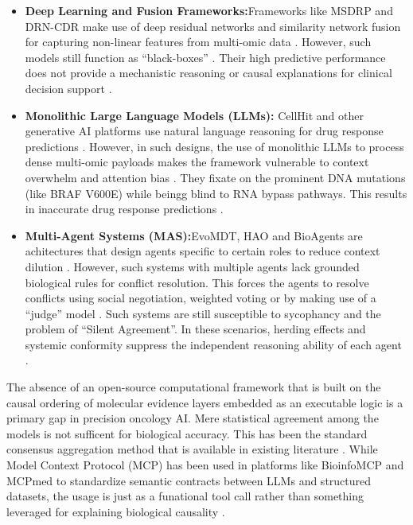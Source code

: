 \documentclass{article}
\begin{document}
\begin{itemize}
    \item \textbf{Deep Learning and Fusion Frameworks:}Frameworks like MSDRP and DRN-CDR make use of deep residual networks and similarity network fusion for capturing non-linear features from multi-omic data \cite{saranya2024drn, zhao2023msdrp}. However, such models still function as ``black-boxes'' \cite{almutiri2023predicting}. Their high predictive performance does not provide a mechanistic reasoning or causal explanations for clinical decision support \cite{chen2024innovative}. 
    
    \item \textbf{Monolithic Large Language Models (LLMs):} CellHit and other generative AI platforms use natural language reasoning for drug response predictions \cite{parca2025cellhit, carli2025learning}. However, in such designs, the use of monolithic LLMs to process dense multi-omic payloads makes the framework vulnerable to context overwhelm  and attention bias \cite{zhou2025large, meng2024application}. They fixate on the prominent DNA mutations (like BRAF V600E) while beingg blind to RNA bypass pathways. This results in inaccurate drug response predictions \cite{kim2025medical}. 
    
    \item \textbf{Multi-Agent Systems (MAS):}EvoMDT, HAO and BioAgents are achitectures that design agents specific to certain roles to reduce context dilution \cite{liu2026evomdt, codella2025demo, mehandru2025bioagents}. However, such systems with multiple agents lack grounded biological rules for conflict resolution. This forces the agents to resolve conflicts using social negotiation, weighted voting or by making use of a ``judge'' model \cite{kaesberg2025voting}. Such systems are still susceptible to sycophancy and the problem of ``Silent Agreement''. In these scenarios, herding effects and systemic conformity suppress the independent reasoning ability of each agent \cite{cui2025freemad, turpin2023language}.
\end{itemize}

The absence of an open-source computational framework that is built on the causal ordering of molecular evidence layers embedded as an executable logic is a primary gap in precision oncology AI. Mere statistical agreement among the models is not sufficent for biological accuracy. This has been the standard consensus aggregation method that is available in existing literature \cite{cui2025freemad}. While Model Context Protocol (MCP) has been used in platforms like BioinfoMCP and MCPmed to standardize semantic contracts between LLMs and structured datasets, the usage is just as a funational tool call rather than something leveraged for explaining biological causality \cite{widjaja2025bioinfomcp, flotho2026mcpmed}. 
\end{document}
